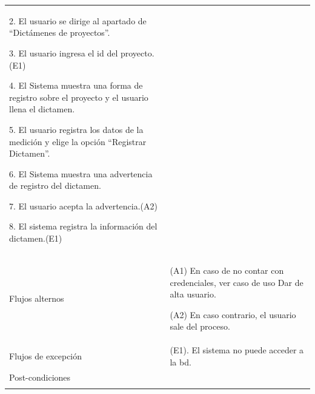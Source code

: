 \begin{longtable}{@{\extracolsep{8pt}}l p{8.5cm}}
 2. El usuario se dirige al apartado de “Dictámenes de proyectos”. \par\vspace{.1cm}

 3. El usuario ingresa el id del proyecto.(E1) \par\vspace{.1cm}

 4. El Sistema muestra una forma de registro sobre el proyecto y el usuario llena el dictamen. \par\vspace{.1cm}

 5. El usuario registra los datos de la  medición y elige la opción “Registrar Dictamen”. \par\vspace{.1cm}

 6. El Sistema muestra una advertencia de registro del  dictamen. \par\vspace{.1cm}

 7. El usuario acepta la advertencia.(A2) \par\vspace{.1cm}

 8. El sistema registra la información del dictamen.(E1) \par\vspace{.1cm}

\\

\hspace{.2cm}Flujos alternos &
\par (A1) En caso de no contar con credenciales, ver caso de uso Dar de alta usuario.

\par (A2) En caso contrario, el usuario sale del proceso.



\\

\hspace{.2cm}Flujos de excepción &
\par\vspace{.1cm} (E1). El sistema no puede acceder a la bd.


\\%

\hspace{.2cm}Post-condiciones &
\\
\hline

 \\
\end{longtable}
\endgroup



